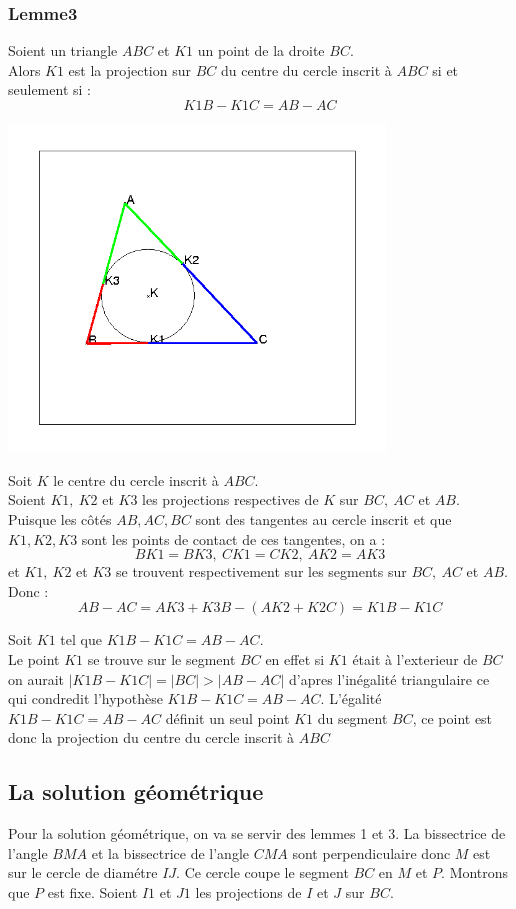 \documentclass[a4paper,11pt]{book}
\begin{document}
\subsubsection{Lemme3}
Soient un triangle $ABC$ et $K1$ un point de la droite $BC$.\\
Alors $K1$ est la projection sur $BC$ du centre du cercle inscrit \`a $ABC$ si 
et seulement si :
$$K1B-K1C=AB-AC$$
\begin{center}\includegraphics[width=10cm]{inscrit3}\end{center}
Soit $K$ le centre du cercle inscrit \`a $ABC$.\\
Soient $K1,\ K2$ et $K3$ les projections respectives de $K$ sur $BC,\ AC$ et 
$AB$.
Puisque les c\^ot\'es $AB,AC,BC$ sont des tangentes au cercle inscrit et que
$K1,K2,K3$ sont les points de contact de ces tangentes, on a :
$$BK1=BK3,\ CK1=CK2,\ AK2=AK3$$ et 
$K1,\ K2$ et $K3$ se trouvent respectivement sur les segments sur $BC,\ AC$ et
$AB$.
Donc :
$$AB-AC=AK3+K3B-(AK2+K2C)=K1B-K1C$$

Soit $K1$ tel que $K1B-K1C=AB-AC$.\\
Le point $K1$ se trouve sur le segment $BC$ en effet si $K1$ \'etait \`a 
l'exterieur de $BC$ on aurait $|K1B-K1C|=|BC|>|AB-AC|$ d'apres l'in\'egalit\'e 
triangulaire ce qui condredit l'hypoth\`ese $K1B-K1C=AB-AC$.
L'\'egalit\'e $K1B-K1C=AB-AC$ d\'efinit un seul point $K1$ du segment $BC$, ce 
point est donc la projection du centre du cercle inscrit \`a $ABC$
\subsection{La solution g\'eom\'etrique}
Pour la solution g\'eom\'etrique, on va se servir des lemmes 1 et 3.
La bissectrice de l'angle $BMA$ et la bissectrice de l'angle $ CMA$ sont perpendiculaire donc $M$ est sur le cercle de diam\'etre $IJ$.
Ce cercle  coupe le segment $BC$ en $M$ et $P$. Montrons que $P$ est fixe.
Soient $I1$ et $J1$ les projections de $I$ et $J$ sur $BC$.
\end{document}
